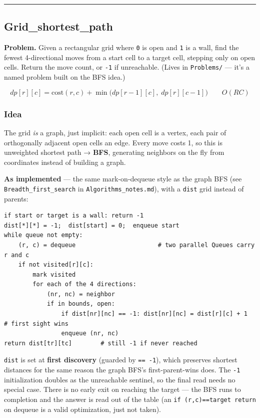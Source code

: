 \documentclass[
  10pt,
  letterpaper,
  onecolumn]{article}
\begin{document}
\begin{center}\rule{0.5\linewidth}{0.5pt}\end{center}

\hypertarget{grid_shortest_path}{%
\subsection{Grid\_shortest\_path}\label{grid_shortest_path}}

\textbf{Problem.} Given a rectangular grid where \texttt{0} is open and
\texttt{1} is a wall, find the fewest 4-directional moves from a start
cell to a target cell, stepping only on open cells. Return the move
count, or \texttt{-1} if unreachable. (Lives in \texttt{Problems/} ---
it's a named problem built on the BFS idea.)

\begin{equation*}
dp[r][c]=\text{cost}(r,c)+\min\bigl(dp[r-1][c],\;dp[r][c-1]\bigr)
\qquad O(RC)
\end{equation*}

\hypertarget{idea-16}{%
\subsubsection{Idea}\label{idea-16}}

The grid \emph{is} a graph, just implicit: each open cell is a vertex,
each pair of orthogonally adjacent open cells an edge. Every move costs
1, so this is unweighted shortest path → \textbf{BFS}, generating
neighbors on the fly from coordinates instead of building a graph.

\textbf{As implemented} --- the same mark-on-dequeue style as the graph
BFS (see \texttt{Breadth\_first\_search} in
\texttt{Algorithms\_notes.md}), with a \texttt{dist} grid instead of
parents:

\begin{verbatim}
if start or target is a wall: return -1
dist[*][*] = -1;  dist[start] = 0;  enqueue start
while queue not empty:
    (r, c) = dequeue                       # two parallel Queues carry r and c
    if not visited[r][c]:
        mark visited
        for each of the 4 directions:
            (nr, nc) = neighbor
            if in bounds, open:
                if dist[nr][nc] == -1: dist[nr][nc] = dist[r][c] + 1   # first sight wins
                enqueue (nr, nc)
return dist[tr][tc]        # still -1 if never reached
\end{verbatim}

\texttt{dist} is set at \textbf{first discovery} (guarded by
\texttt{==\ -1}), which preserves shortest distances for the same reason
the graph BFS's first-parent-wins does. The \texttt{-1} initialization
doubles as the unreachable sentinel, so the final read needs no special
case. There is no early exit on reaching the target --- the BFS runs to
completion and the answer is read out of the table (an
\texttt{if\ (r,c)==target\ return} on dequeue is a valid optimization,
just not taken).
\end{document}
